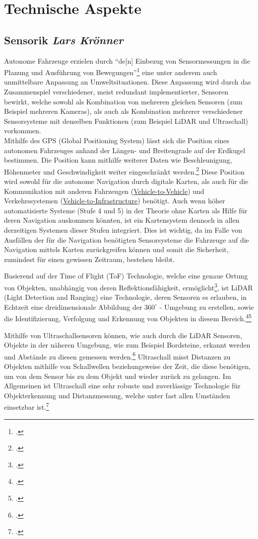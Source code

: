 \documentclass[a4paper, 12pt, openany]{book}
\newcommand\Section[2]{\section[#1 {\scriptsize\itshape#2}]{#1 \footnotesize\itshape#2}}
\begin{document}
    \chapter{Technische Aspekte}
        \Section{Sensorik}{Lars Krönner}
            Autonome Fahrzeuge erzielen durch \enquote{de[n] Einbezug von Sensormessungen in die Planung und Ausführung von Bewegungen}\footcite[60]{robotik} eine unter anderem auch unmittelbare Anpassung an Umweltsituationen. Diese Anpassung wird durch das Zusammenspiel verschiedener, meist redundant implementierter, Sensoren bewirkt, welche sowohl als Kombination von mehreren gleichen Sensoren (zum Beispiel mehreren Kameras), als auch als Kombination mehrerer verschiedener Sensorsysteme mit denselben Funktionen (zum Beispiel LiDAR und Ultraschall) vorkommen.\\
            
                Mithilfe des GPS (Global Positioning System) lässt sich die Position eines autonomen Fahrzeuges anhand der Längen- und Breitengrade auf der Erdkugel bestimmen. Die Position kann mithilfe weiterer Daten wie Beschleunigung, Höhenmeter und Geschwindigkeit weiter eingeschränkt werden.\footcite[37]{rathod2013autonomous} Diese Position wird sowohl für die autonome Navigation durch digitale Karten, als auch für die Kommunikation mit anderen Fahrzeugen (\hyperref[V2V]{Vehicle-to-Vehicle}) und Verkehrssystemen (\hyperref[V2I]{Vehicle-to-Infrastructure}) benötigt. Auch wenn höher automatisierte Systeme (Stufe 4 und 5) in der Theorie ohne Karten als Hilfe für deren Navigation auskommen könnten, ist ein Kartensystem dennoch in allen derzeitigen Systemen dieser Stufen integriert. Dies ist wichtig, da im Falle von Ausfällen der für die Navigation benötigten Sensorsysteme die Fahrzeuge auf die Navigation mittels Karten zurückgreifen können und somit die Sicherheit, zumindest für einen gewissen Zeitraum, bestehen bleibt.
            
                Basierend auf der Time of Flight (ToF) Technologie, welche eine genaue Ortung von Objekten, unabhängig von deren Reflektionsfähigkeit, ermöglicht\footcite{tof}, ist LiDAR (Light Detection and Ranging) eine Technologie, deren Sensoren es erlauben, in Echtzeit eine dreidimensionale Abbildung der $360^{\circ}$ - Umgebung zu erstellen, sowie die Identifizierung, Verfolgung und Erkennung von Objekten in diesem Bereich.\footcite{mooney2019lidar}\footcite[36]{rathod2013autonomous}
            
                Mithilfe von Ultraschallsensoren können, wie auch durch die LiDAR Sensoren, Objekte in der näheren Umgebung, wie zum Beispiel Bordsteine, erkannt werden und Abstände zu diesen gemessen werden.\footcite[37]{rathod2013autonomous}
                Ultraschall misst Distanzen zu Objekten mithilfe von Schallwellen beziehungsweise der Zeit, die diese benötigen, um von dem Sensor bis zu dem Objekt und wieder zurück zu gelangen.
                Im Allgemeinen ist Ultraschall eine sehr robuste und zuverlässige Technologie für Objekterkennung und Distanzmessung, welche unter fast allen Umständen einsetzbar ist.\footcite{ultrasonic}
                
\end{document}
